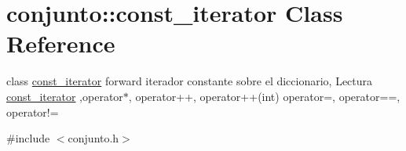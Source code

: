 \hypertarget{classconjunto_1_1const__iterator}{\section{conjunto\-:\-:const\-\_\-iterator Class Reference}
\label{classconjunto_1_1const__iterator}
}


class \hyperlink{classconjunto_1_1const__iterator}{const\-\_\-iterator} forward iterador constante sobre el diccionario, Lectura \hyperlink{classconjunto_1_1const__iterator}{const\-\_\-iterator} ,operator$\ast$, operator++, operator++(int) operator=, operator==, operator!=  




{\ttfamily \#include $<$conjunto.\-h$>$}

